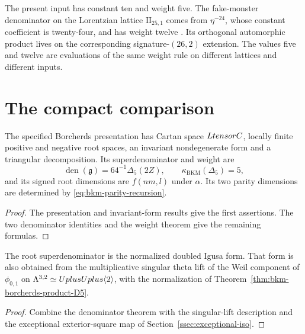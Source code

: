 \begin{remark}
\label{rem:bkm-two-inputs-one-weight-rule}
\label{rem:bkm-paramodular-fake-monster-rows}
The present input has constant ten and weight five.
The fake-monster denominator on the Lorentzian lattice
$\mathrm{II}_{25,1}$ comes from $\eta^{-24}$, whose constant
coefficient is twenty-four, and has weight twelve
\cite{BorcherdsGKM88,Borcherds95}. Its orthogonal automorphic
product lives on the corresponding signature-$(26,2)$ extension.
The values five and twelve are evaluations of the same weight rule
on different lattices and different inputs.
\end{remark}

\section{The compact comparison}
\label{sec:bkm-summary-theorem}
\label{sec:bkm-cross-view-boundary}
\label{sec:bkm-closing}
\label{sec:bkm-coda}

\begin{theorem}
\label{thm:bkm-denominator-algebra-identity}
The specified Borcherds presentation has Cartan space $LtensorC$,
locally finite positive and negative root spaces, an invariant
nondegenerate form and a triangular decomposition. Its
superdenominator and weight are
\[
 \operatorname{den}(\mathfrak g)=64^{-1}\Delta_5(2Z),\qquad
 \kappa_{\mathrm{BKM}}(\Delta_5)=5,
\]
and its signed root dimensions are $f(nm,l)$ under $\alpha$.
Its two parity dimensions are determined by
\eqref{eq:bkm-parity-recursion}.
\end{theorem}
\begin{proof}
The presentation and invariant-form results give the first
assertions. The two denominator identities and the weight theorem
give the remaining formulas.
\end{proof}

\begin{corollary}
\label{thm:bkm-view-I-II}
\label{thm:bkm-view-II-V}
The root superdenominator is the normalized doubled Igusa form.
That form is also obtained from the multiplicative singular theta
lift of the Weil component of $\phi_{0,1}$ on
$\Lambda^{3,2}\simeq Uplus Uplus\langle2\rangle$, with the
normalization of Theorem~\ref{thm:bkm-borcherds-product-D5}.
\end{corollary}
\begin{proof}
Combine the denominator theorem with the singular-lift description
\cite[Theorem~13.3]{B} and the exceptional exterior-square map
of Section~\ref{ssec:exceptional-iso}.
\end{proof}

